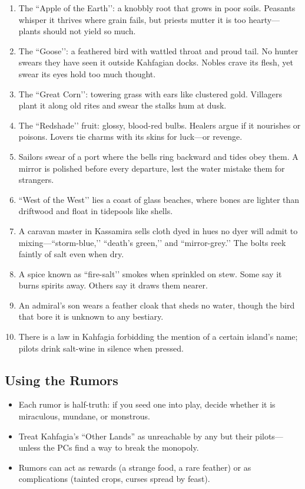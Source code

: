 \begin{enumerate}
\item The  ``Apple of the Earth’’: a knobbly root that grows in poor soils. Peasants whisper it thrives where grain fails, but priests mutter it is too hearty—plants should not yield so much.
\item The  ``Goose’’: a feathered bird with wattled throat and proud tail. No hunter swears they have seen it outside Kahfagian docks. Nobles crave its flesh, yet swear its eyes hold too much thought.
\item The  ``Great Corn’’: towering grass with ears like clustered gold. Villagers plant it along old rites and swear the stalks hum at dusk.
\item The  ``Redshade’’ fruit: glossy, blood-red bulbs. Healers argue if it nourishes or poisons. Lovers tie charms with its skins for luck—or revenge.
\item Sailors swear of a port where the bells ring backward and tides obey them. A mirror is polished before every departure, lest the water mistake them for strangers.
\item ``West of the West’’ lies a coast of glass beaches, where bones are lighter than driftwood and float in tidepools like shells.
\item A caravan master in Kassamira sells cloth dyed in hues no dyer will admit to mixing—``storm-blue,’’ ``death’s green,’’ and ``mirror-grey.’’ The bolts reek faintly of salt even when dry.
\item A spice known as ``fire-salt’’ smokes when sprinkled on stew. Some say it burns spirits away. Others say it draws them nearer.
\item An admiral’s son wears a feather cloak that sheds no water, though the bird that bore it is unknown to any bestiary.
\item There is a law in Kahfagia forbidding the mention of a certain island’s name; pilots drink salt-wine in silence when pressed.
\end{enumerate}

\subsection*{Using the Rumors}
\begin{itemize}
\item Each rumor is half-truth: if you seed one into play, decide whether it is miraculous, mundane, or monstrous.
\item Treat Kahfagia’s “Other Lands” as unreachable by any but their pilots—unless the PCs find a way to break the monopoly.
\item Rumors can act as rewards (a strange food, a rare feather) or as complications (tainted crops, curses spread by feast).
\end{itemize}

